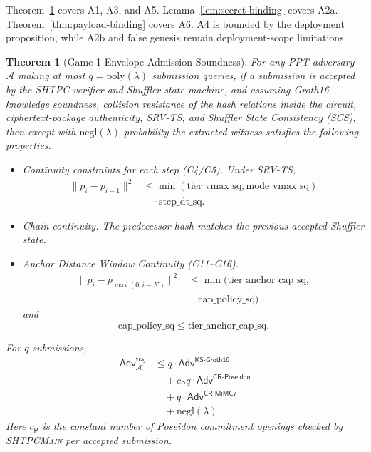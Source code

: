 \documentclass[journal]{IEEEtran}
\theoremstyle{definition}
\theoremstyle{plain}
\newtheorem{theorem}{Theorem}
\begin{document}
Theorem~\ref{thm:traj-integrity} covers A1, A3, and A5. Lemma~\ref{lem:secret-binding}
covers A2a. Theorem~\ref{thm:payload-binding} covers A6. A4 is bounded by the
deployment proposition, while A2b and false genesis remain deployment-scope
limitations.

\begin{theorem}[Game 1 Envelope Admission Soundness]
  \label{thm:traj-integrity}
  For any PPT adversary $\mathcal{A}$ making at most
  $q=\mathrm{poly}(\lambda)$ submission queries, if a submission is accepted by
  the \textsc{SHTPC} verifier and Shuffler state machine, and assuming Groth16
  knowledge soundness, collision resistance of the hash relations inside the circuit,
  ciphertext-package authenticity, SRV-TS, and Shuffler State Consistency (SCS),
  then except with
  $\mathrm{negl}(\lambda)$ probability the extracted witness satisfies the
  following properties.
  \begin{itemize}
      \setlength{\itemsep}{0pt}
      \setlength{\parsep}{0pt}
      \setlength{\topsep}{2pt}
    \item[\textbf{E1}] \emph{Continuity constraints for each step (C4/C5).}
      Under SRV-TS,
      \[
        \begin{aligned}
          \|p_i-p_{i-1}\|^2
          &\le \min(\mathrm{tier\_vmax\_sq},
          \mathrm{mode\_vmax\_sq}) \\
          &\quad\cdot \mathrm{step\_dt\_sq}.
        \end{aligned}
      \]
    \item[\textbf{E2}] \emph{Chain continuity.}
      The predecessor hash matches the previous accepted Shuffler state.
    \item[\textbf{E3}] \emph{Anchor Distance Window Continuity (C11--C16).}
      \[
        \begin{aligned}
        \|p_i-p_{\max(0,i-K)}\|^2
        &\le
        \min(\mathrm{tier\_anchor\_cap\_sq},\\
        &\quad \mathrm{cap\_policy\_sq})
        \end{aligned}
      \]
      and
      \[
        \mathrm{cap\_policy\_sq}
        \le
        \mathrm{tier\_anchor\_cap\_sq}.
      \]
  \end{itemize}

  For $q$ submissions,
  \begin{equation}
    \label{eq:traj-integrity-bound}
    \begin{aligned}
      \mathsf{Adv}^{\mathsf{traj}}_{\mathcal{A}}
      &\le q\cdot\mathsf{Adv}^{\mathsf{KS\text{-}Groth16}} \\
      &\quad {}+ c_{\mathsf{P}}q\cdot
      \mathsf{Adv}^{\mathsf{CR\text{-}Poseidon}} \\
      &\quad {}+ q\cdot\mathsf{Adv}^{\mathsf{CR\text{-}MiMC7}} \\
      &\quad {}+ \mathrm{negl}(\lambda).
    \end{aligned}
  \end{equation}
  Here $c_{\mathsf{P}}$ is the constant number of Poseidon commitment openings
  checked by \textsc{SHTPCMain} per accepted submission.
\end{theorem}
\end{document}
